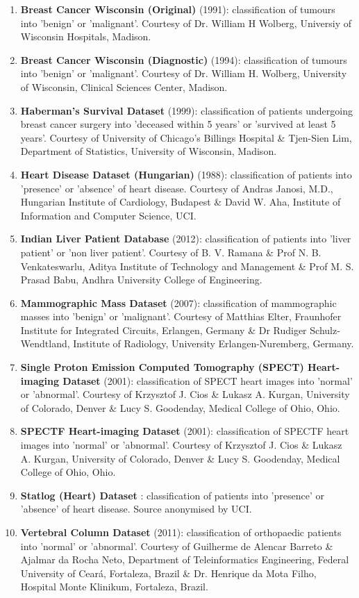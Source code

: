 \documentclass{document}
\begin{document}
\begin{enumerate}
    \item \textbf{Breast Cancer Wisconsin (Original)} (1991): classification of tumours into 'benign' or 'malignant'. Courtesy of Dr. William H Wolberg, Universiy of Wisconsin Hospitals, Madison.
    \item \textbf{Breast Cancer Wisconsin (Diagnostic)} (1994): classification of tumours into 'benign' or 'malignant'. Courtesy of Dr. William H. Wolberg, University of Wisconsin, Clinical Sciences Center, Madison.
    \item \textbf{Haberman's Survival Dataset} (1999): classification of patients undergoing breast cancer surgery into 'deceased within 5 years' or 'survived at least 5 years'. Courtesy of University of Chicago's Billings Hospital \& Tjen-Sien Lim, Department of Statistics, University of Wisconsin, Madison.
    \item \textbf{Heart Disease Dataset (Hungarian)} (1988): classification of patients into 'presence' or 'absence' of heart disease. Courtesy of Andras Janosi, M.D., Hungarian Institute of Cardiology, Budapest \& David W. Aha, Institute of Information and Computer Science, UCI.
    \item \textbf{Indian Liver Patient Database} (2012): classification of patients into 'liver patient' or 'non liver patient'. Courtesy of B. V. Ramana \& Prof N. B. Venkateswarlu, Aditya Institute of Technology and Management \& Prof M. S. Prasad Babu, Andhra University College of Engineering.
    \item \textbf{Mammographic Mass Dataset} (2007): classification of mammographic masses into 'benign' or 'malignant'. Courtesy of Matthias Elter, Fraunhofer Institute for Integrated Circuits, Erlangen, Germany \& Dr Rudiger Schulz-Wendtland, Institute of Radiology, University Erlangen-Nuremberg, Germany.
    \item \textbf{Single Proton Emission Computed Tomography (SPECT) Heart-imaging Dataset} (2001): classification of SPECT heart images into 'normal' or 'abnormal'. Courtesy of Krzysztof J. Cios \& Lukasz A. Kurgan, University of Colorado, Denver \& Lucy S. Goodenday, Medical College of Ohio, Ohio.
    \item \textbf{SPECTF Heart-imaging Dataset} (2001): classification of SPECTF heart images into 'normal' or 'abnormal'. Courtesy of Krzysztof J. Cios \& Lukasz A. Kurgan, University of Colorado, Denver \& Lucy S. Goodenday, Medical College of Ohio, Ohio.
    \item \textbf{Statlog (Heart) Dataset} : classification of patients into 'presence' or 'absence' of heart disease. Source anonymised by UCI.
    \item \textbf{Vertebral Column Dataset} (2011): classification of orthopaedic patients into 'normal' or 'abnormal'. Courtesy of Guilherme de Alencar Barreto \& Ajalmar da Rocha Neto, Department of Teleinformatics Engineering, Federal University of Ceará, Fortaleza, Brazil \& Dr. Henrique da Mota Filho, Hospital Monte Klinikum, Fortaleza, Brazil.
\end{enumerate}
\end{document}
